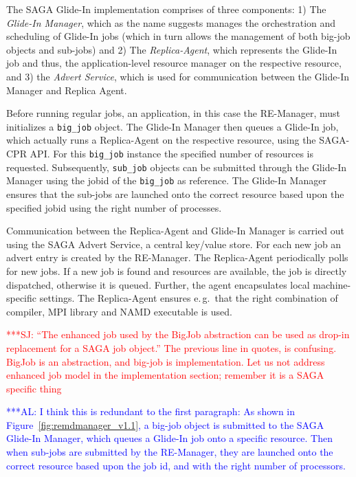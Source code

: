 \documentclass{rspublic}
\newcommand{\alnote}[1]{ {\textcolor{blue} { ***AL: #1 }}}
\newcommand{\jhanote}[1]{ {\textcolor{red} { ***SJ: #1 }}}
\newcommand{\alnote}[1]{}
\newcommand{\jhanote}[1]{}
\newcommand{\replicaagent}[1]{Replica-Agent }
\begin{document}
The SAGA Glide-In implementation comprises of three components: 1) The
\emph{Glide-In Manager}, which as the name suggests manages the
orchestration and scheduling of Glide-In jobs (which in turn allows
the management of both big-job objects and sub-jobs) and 2) The
\emph{Replica-Agent}, which represents the Glide-In job and thus, the
application-level resource manager on the respective resource, and 3)
the \emph{Advert Service}, which is used for communication between the
Glide-In Manager and Replica Agent.


Before running regular jobs, an application, in this case the 
RE-Manager, must initializes a
\texttt{big\_job} object. The Glide-In Manager then queues a Glide-In
job, which actually runs a Replica-Agent on the respective resource,
using the SAGA-CPR API.  For this \texttt{big\_job} instance the
specified number of resources is requested. Subsequently,
\texttt{sub\_job} objects can be submitted through the Glide-In
Manager using the jobid of the \texttt{big\_job} as reference.
The Glide-In Manager ensures that the sub-jobs are launched onto the 
correct resource based upon the specified jobid using the right number
of processes.

Communication between the Replica-Agent and Glide-In Manager is
carried out using the SAGA Advert Service, a central key/value
store. For each new job an advert entry is created by the
RE-Manager. The \replicaagent\ periodically polls for new jobs.  If a
new job is found and resources are available, the job is directly
dispatched, otherwise it is queued. Further, the agent encapsulates
local machine-specific settings. The \replicaagent\
ensures e.\,g.\ that the right combination of compiler, MPI library and NAMD
executable is used.


\jhanote{``The enhanced job used by the BigJob abstraction can be used
  as drop-in replacement for a SAGA job object.'' The previous line in
  quotes, is confusing. BigJob is an abstraction, and big-job is
  implementation. Let us not address enhanced job model in the
  implementation section; remember it is a SAGA specific thing}

\alnote{I think this is redundant to the first paragraph: As 
shown in Figure~\ref{fig:remdmanager_v1.1}, a big-job object is
submitted to the SAGA Glide-In Manager, which queues a Glide-In job
onto a specific resource. Then when sub-jobs are submitted by the
RE-Manager, they are launched onto the correct resource based upon the
job id, and with the right number of processors.  }
\end{document}
